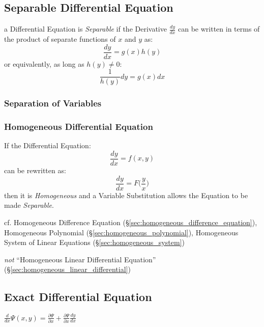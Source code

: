 \subsection{Separable Differential Equation}\label{sec:separable}

a Differential Equation is \emph{Separable} if the Derivative $\frac{dy}{dx}$
can be written in terms of the product of separate functions of $x$ and $y$ as:
\[
  \frac{dy}{dx} = g(x)h(y)
\]
or equivalently, as long as $h(y) \neq 0$:
\[
  \frac{1}{h(y)} dy = g(x) dx
\]



\subsubsection{Separation of Variables}\label{sec:separation_of_variables}

\subsubsection{Homogeneous Differential Equation}
\label{sec:homogeneous_differential_equation}

If the Differential Equation:
\[
  \frac{dy}{dx} = f(x,y)
\]
can be rewritten as:
\[
  \frac{dy}{dx} = F\Big(\frac{y}{x}\Big)
\]
then it is \emph{Homogeneous} and a Variable Substitution allows the Equation to
be made \emph{Separable}.

cf. Homogeneous Difference Equation
(\S\ref{sec:homogeneous_difference_equation}), Homogeneous Polynomial
(\S\ref{sec:homogeneous_polynomial}), Homogeneous System of Linear Equations
(\S\ref{sec:homogeneous_system})

\emph{not} ``Homogeneous Linear Differential Equation''
(\S\ref{sec:homogeneous_linear_differential})



\subsection{Exact Differential Equation}\label{sec:exact_equation}

$\frac{d}{dx}\Psi(x,y) = \frac{\partial{\Psi}}{\partial{x}}
  + \frac{\partial{\Psi}}{\partial{x}}\frac{dy}{dx}$

